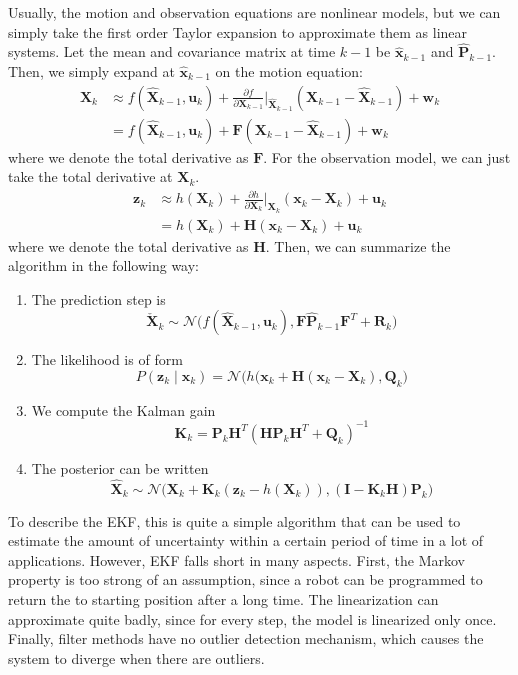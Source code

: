 \documentclass{article}
\theoremstyle{definition}
\theoremstyle{remark}
\theoremstyle{definition}
\begin{document}
Usually, the motion and observation equations are nonlinear models, but we can simply take the first order Taylor expansion to approximate them as linear systems. Let the mean and covariance matrix at time $k - 1$ be $\hat{\mathbf{x}}_{k-1}$ and $\hat{\mathbf{P}}_{k-1}$. Then, we simply expand at $\hat{\mathbf{x}}_{k-1}$ on the motion equation: 
\begin{align*}
    \mathbf{X}_k & \approx f(\hat{\mathbf{X}}_{k-1}, \mathbf{u}_k) + \frac{\partial f}{\partial \mathbf{X}_{k-1}} \bigg|_{\hat{\mathbf{X}}_{k-1}} (\mathbf{X}_{k-1} - \hat{\mathbf{X}}_{k-1}) + \mathbf{w}_k \\
    & = f(\hat{\mathbf{X}}_{k-1}, \mathbf{u}_k) + \mathbf{F} (\mathbf{X}_{k-1} - \hat{\mathbf{X}}_{k-1}) + \mathbf{w}_k 
\end{align*}
where we denote the total derivative as $\mathbf{F}$. For the observation model, we can just take the total derivative at $\mathbf{X}_k$. 
\begin{align*}
    \mathbf{z}_k & \approx h(\mathbf{X}_k) + \frac{\partial h}{\partial \mathbf{X}_k} \bigg|_{\mathbf{X}_k} (\mathbf{x}_k - \mathbf{X}_k) + \mathbf{u}_k \\
    & = h(\mathbf{X}_k) + \mathbf{H} (\mathbf{x}_k - \mathbf{X}_k) + \mathbf{u}_k 
\end{align*}
where we denote the total derivative as $\mathbf{H}$. Then, we can summarize the algorithm in the following way: 
\begin{enumerate}
    \item The prediction step is 
    \[\check{\mathbf{X}}_k \sim \mathcal{N}\big( f( \hat{\mathbf{X}}_{k-1}, \mathbf{u}_k), \mathbf{F} \hat{\mathbf{P}}_{k-1} \mathbf{F}^T + \mathbf{R}_k)\]
    \item The likelihood is of form 
    \[P(\mathbf{z}_k \mid \mathbf{x}_k) = \mathcal{N}\big( h(\mathbf{x}_k + \mathbf{H}(\mathbf{x}_k - \mathbf{X}_k), \mathbf{Q}_k \big)\]
    \item We compute the Kalman gain 
    \[\mathbf{K}_k = \mathbf{P}_k \mathbf{H}^T ( \mathbf{H} \mathbf{P}_k \mathbf{H}^T + \mathbf{Q}_k)^{-1}\]
    \item The posterior can be written 
    \[\hat{\mathbf{X}}_k \sim \mathcal{N}\big( \mathbf{X}_k + \mathbf{K}_k (\mathbf{z}_k - h(\mathbf{X}_k)), (\mathbf{I} - \mathbf{K}_k \mathbf{H}) \mathbf{P}_k \big) \]
\end{enumerate}

To describe the EKF, this is quite a simple algorithm that can be used to estimate the amount of uncertainty within a certain period of time in a lot of applications. However, EKF falls short in many aspects. First, the Markov property is too strong of an assumption, since a robot can be programmed to return the to starting position after a long time. The linearization can approximate quite badly, since for every step, the model is linearized only once. Finally, filter methods have no outlier detection mechanism, which causes the system to diverge when there are outliers. 
\end{document}
